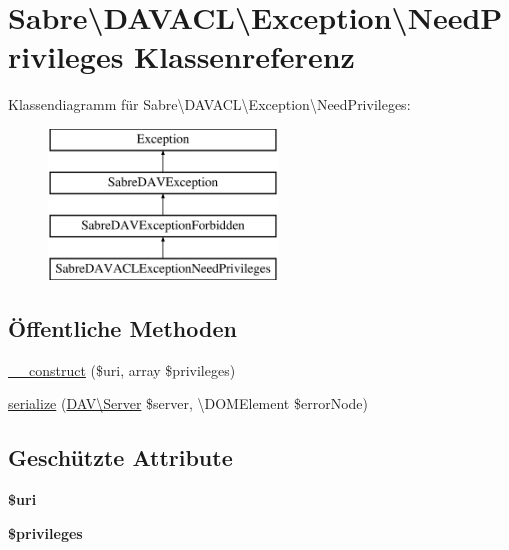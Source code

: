 \hypertarget{class_sabre_1_1_d_a_v_a_c_l_1_1_exception_1_1_need_privileges}{}\section{Sabre\textbackslash{}D\+A\+V\+A\+CL\textbackslash{}Exception\textbackslash{}Need\+Privileges Klassenreferenz}
\label{class_sabre_1_1_d_a_v_a_c_l_1_1_exception_1_1_need_privileges}
Klassendiagramm für Sabre\textbackslash{}D\+A\+V\+A\+CL\textbackslash{}Exception\textbackslash{}Need\+Privileges\+:\begin{figure}[H]
\begin{center}
\leavevmode
\includegraphics[height=4.000000cm]{class_sabre_1_1_d_a_v_a_c_l_1_1_exception_1_1_need_privileges}
\end{center}
\end{figure}
\subsection*{Öffentliche Methoden}
\begin{DoxyCompactItemize}
\item 
\mbox{\hyperlink{class_sabre_1_1_d_a_v_a_c_l_1_1_exception_1_1_need_privileges_ac98b0253f55ae12dd034c5e0103af38d}{\+\_\+\+\_\+construct}} (\$uri, array \$privileges)
\item 
\mbox{\hyperlink{class_sabre_1_1_d_a_v_a_c_l_1_1_exception_1_1_need_privileges_a3e12c4140b4684420e40aff8423502a2}{serialize}} (\mbox{\hyperlink{class_sabre_1_1_d_a_v_1_1_server}{D\+A\+V\textbackslash{}\+Server}} \$server, \textbackslash{}D\+O\+M\+Element \$error\+Node)
\end{DoxyCompactItemize}
\subsection*{Geschützte Attribute}
\begin{DoxyCompactItemize}
\item 
\mbox{\label{class_sabre_1_1_d_a_v_a_c_l_1_1_exception_1_1_need_privileges_a49b15f85a605a0eabe8bbc90469b1f1d}} 
{\bfseries \$uri}
\item 
\mbox{\label{class_sabre_1_1_d_a_v_a_c_l_1_1_exception_1_1_need_privileges_af5774abcba277d2b05b844970dc31484}} 
{\bfseries \$privileges}
\end{DoxyCompactItemize}


